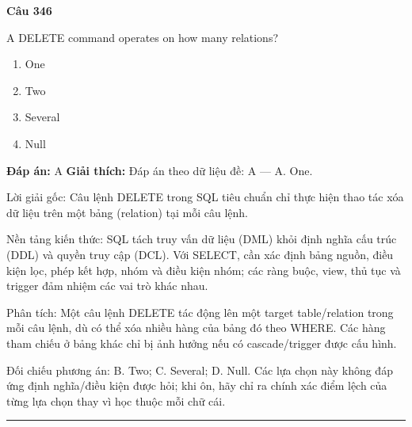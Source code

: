\documentclass[11pt,a4paper]{article}
\newenvironment{question}[1]{%
  \par\vspace{1em}\noindent\textbf{\large Câu #1}\par\vspace{0.4em}
}{%
  \par\vspace{1em}\hrule\vspace{0.6em}
}
\newenvironment{choices}{%
  \begin{enumerate}[label=\textbf{\Alph*.},leftmargin=2.2em,itemsep=2pt,topsep=3pt]
}{%
  \end{enumerate}
}
\newcommand{\choice}{\item}
\begin{document}
\begin{question}{346}
A DELETE command operates on how many relations?
\begin{choices}
\choice One
\choice Two
\choice Several
\choice Null
\end{choices}
\textbf{Đáp án:} A
\textbf{Giải thích:} Đáp án theo dữ liệu đề: A — A. One.

Lời giải gốc: Câu lệnh DELETE trong SQL tiêu chuẩn chỉ thực hiện thao tác xóa dữ liệu trên một bảng (relation) tại mỗi câu lệnh.

Nền tảng kiến thức: SQL tách truy vấn dữ liệu (DML) khỏi định nghĩa cấu trúc (DDL) và quyền truy cập (DCL). Với SELECT, cần xác định bảng nguồn, điều kiện lọc, phép kết hợp, nhóm và điều kiện nhóm; các ràng buộc, view, thủ tục và trigger đảm nhiệm các vai trò khác nhau.

Phân tích: Một câu lệnh DELETE tác động lên một target table/relation trong mỗi câu lệnh, dù có thể xóa nhiều hàng của bảng đó theo WHERE. Các hàng tham chiếu ở bảng khác chỉ bị ảnh hưởng nếu có cascade/trigger được cấu hình.

Đối chiếu phương án: B. Two; C. Several; D. Null. Các lựa chọn này không đáp ứng định nghĩa/điều kiện được hỏi; khi ôn, hãy chỉ ra chính xác điểm lệch của từng lựa chọn thay vì học thuộc mỗi chữ cái.
\end{question}
\end{document}
